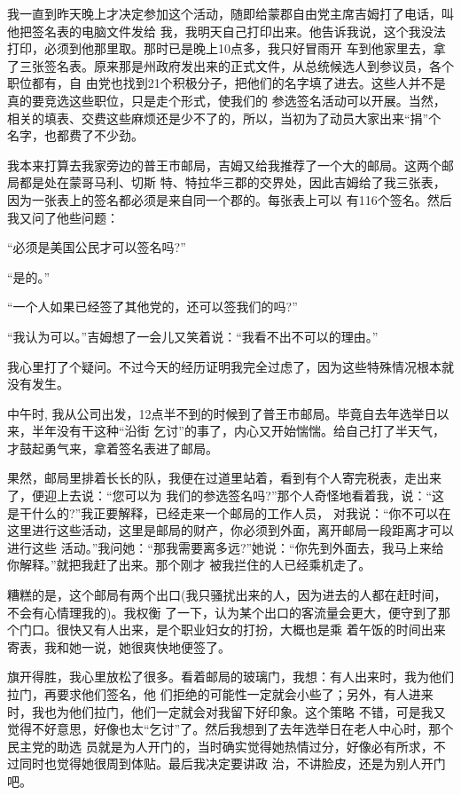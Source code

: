 ﻿\documentclass[11pt]{article}
\begin{document}
我一直到昨天晚上才决定参加这个活动，随即给蒙郡自由党主席吉姆打了电话，叫他把签名表的电脑文件发给
我，我明天自己打印出来。他告诉我说，这个我没法打印，必须到他那里取。那时已是晚上10点多，我只好冒雨开
车到他家里去，拿了三张签名表。原来那是州政府发出来的正式文件，从总统候选人到参议员，各个职位都有，自
由党也找到21个积极分子，把他们的名字填了进去。这些人并不是真的要竞选这些职位，只是走个形式，使我们的
参选签名活动可以开展。当然，相关的填表、交费这些麻烦还是少不了的，所以，当初为了动员大家出来``捐''个
名字，也都费了不少劲。

我本来打算去我家旁边的普王市邮局，吉姆又给我推荐了一个大的邮局。这两个邮局都是处在蒙哥马利、切斯
特、特拉华三郡的交界处，因此吉姆给了我三张表，因为一张表上的签名都必须是来自同一个郡的。每张表上可以
有116个签名。然后我又问了他些问题：

``必须是美国公民才可以签名吗?''

``是的。''

``一个人如果已经签了其他党的，还可以签我们的吗?''

``我认为可以。''吉姆想了一会儿又笑着说：``我看不出不可以的理由。''

我心里打了个疑问。不过今天的经历证明我完全过虑了，因为这些特殊情况根本就没有发生。

中午时, 我从公司出发，12点半不到的时候到了普王市邮局。毕竟自去年选举日以来，半年没有干这种``沿街
乞讨''的事了，内心又开始惴惴。给自己打了半天气，才鼓起勇气来，拿着签名表进了邮局。

果然，邮局里排着长长的队，我便在过道里站着，看到有个人寄完税表，走出来了，便迎上去说：``您可以为
我们的参选签名吗?''那个人奇怪地看着我，说：``这是干什么的?''我正要解释，已经走来一个邮局的工作人员，
对我说：``你不可以在这里进行这些活动，这里是邮局的财产，你必须到外面，离开邮局一段距离才可以进行这些
活动。''我问她：``那我需要离多远?''她说：``你先到外面去，我马上来给你解释。''就把我赶了出来。那个刚才
被我拦住的人已经乘机走了。

糟糕的是，这个邮局有两个出口(我只骚扰出来的人，因为进去的人都在赶时间，不会有心情理我的)。我权衡
了一下，认为某个出口的客流量会更大，便守到了那个门口。很快又有人出来，是个职业妇女的打扮，大概也是乘
着午饭的时间出来寄表，我和她一说，她很爽快地便签了。

旗开得胜，我心里放松了很多。看着邮局的玻璃门，我想：有人出来时，我为他们拉门，再要求他们签名，他
们拒绝的可能性一定就会小些了；另外，有人进来时，我也为他们拉门，他们一定就会对我留下好印象。这个策略
不错，可是我又觉得不好意思，好像也太``乞讨''了。然后我想到了去年选举日在老人中心时，那个民主党的助选
员就是为人开门的，当时确实觉得她热情过分，好像必有所求，不过同时也觉得她很周到体贴。最后我决定要讲政
治，不讲脸皮，还是为别人开门吧。
\end{document}
